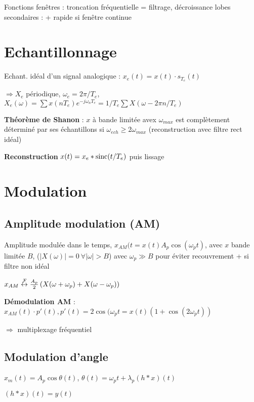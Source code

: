 Fonctions fenêtres : troncation fréquentielle = filtrage, décroissance lobes secondaires : + rapide si fenêtre continue



\section{Echantillonnage}

Echant. idéal d'un signal analogique : $x_e(t) = x(t) \cdot s_{T_e}(t)$

$\Rightarrow X_e$ périodique, $\omega_e = 2\pi/T_e$, $X_e(\omega) = \sum x(nT_e) e^{-j\omega_n T_e} = 1/T_e \sum X(\omega - 2\pi n / T_e)$  

\textbf{Théorème de Shanon} : $x$ à bande limitée avex $\omega_{max}$ est complètement déterminé par ses échantillons si $\omega_{ech} \geq 2\omega_{max}$ (reconstruction avec filtre rect idéal)

\textbf{Reconstruction} $x(t) = x_e * \operatorname{sinc}(t/T_e)$ puis lissage



\section{Modulation}

\subsection*{Amplitude modulation (AM)}
Amplitude modulée dans le temps, $x_{AM}(t = x(t) A_p \cos(\omega_pt)$, avec $x$ bande limitée $B$, ($|X(\omega)|=0 \: \forall |\omega| > B$) avec $\omega_p \gg B$ pour éviter recouvrement + si filtre non idéal

$x_{AM} \stackrel{\mathcal{F}}{\leftrightarrow} \frac{A_p}{2} \left( X(\omega+\omega_p) + X(\omega-\omega_p) \right)$

\textbf{Démodulation AM} : $x_{AM}(t) \cdot p'(t), p'(t) = 2\cos(\omega_p t = x(t)(1+\cos(2\omega_pt))$

$\Rightarrow$ multiplexage fréquentiel

\subsection*{Modulation d'angle}
$x_m(t) = A_p \cos\theta(t)$, $\theta(t) = \omega_pt + \lambda_p (h*x)(t)$

$(h*x)(t) = y(t)$

